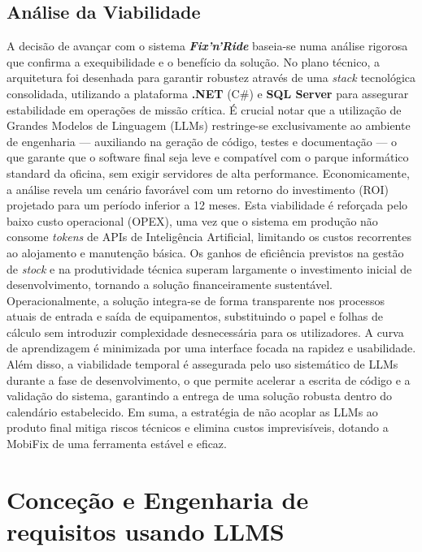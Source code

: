 \documentclass[a4paper,12pt]{scrreprt}
\begin{document}
\section{Análise da Viabilidade}
A decisão de avançar com o sistema \textit{\textbf{Fix'n'Ride}} baseia-se numa análise rigorosa que confirma a exequibilidade e o benefício da solução. No plano técnico, a arquitetura foi desenhada para garantir robustez através de uma \textit{stack} tecnológica consolidada, utilizando a plataforma \textbf{.NET} (C\#) e \textbf{SQL Server} para assegurar estabilidade em operações de missão crítica. É crucial notar que a utilização de Grandes Modelos de Linguagem (LLMs) restringe-se exclusivamente ao ambiente de engenharia — auxiliando na geração de código, testes e documentação — o que garante que o software final seja leve e compatível com o parque informático standard da oficina, sem exigir servidores de alta performance. Economicamente, a análise revela um cenário favorável com um retorno do investimento (ROI) projetado para um período inferior a 12 meses. Esta viabilidade é reforçada pelo baixo custo operacional (OPEX), uma vez que o sistema em produção não consome \textit{tokens} de APIs de Inteligência Artificial, limitando os custos recorrentes ao alojamento e manutenção básica. Os ganhos de eficiência previstos na gestão de \textit{stock} e na produtividade técnica superam largamente o investimento inicial de desenvolvimento, tornando a solução financeiramente sustentável. Operacionalmente, a solução integra-se de forma transparente nos processos atuais de entrada e saída de equipamentos, substituindo o papel e folhas de cálculo sem introduzir complexidade desnecessária para os utilizadores. A curva de aprendizagem é minimizada por uma interface focada na rapidez e usabilidade. Além disso, a viabilidade temporal é assegurada pelo uso sistemático de LLMs durante a fase de desenvolvimento, o que permite acelerar a escrita de código e a validação do sistema, garantindo a entrega de uma solução robusta dentro do calendário estabelecido. Em suma, a estratégia de não acoplar as LLMs ao produto final mitiga riscos técnicos e elimina custos imprevisíveis, dotando a MobiFix de uma ferramenta estável e eficaz. 

\chapter{Conceção e Engenharia de requisitos usando LLMS}
\end{document}
